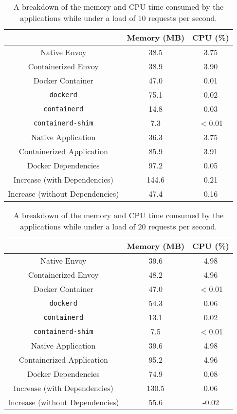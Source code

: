 \documentclass{article}
\begin{document}
\begin{table}[H]
\begin{tabular}{ |c|c|c| }
 \hline
   & Memory (MB) & CPU (\%) \\ 
 \hline
 Native Envoy & 38.5 & 3.75 \\
 \hline
 Containerized Envoy & 38.9 & 3.90 \\
 \hline
 Docker Container & 47.0 & 0.01 \\
 \hline
 \texttt{dockerd} & 75.1 & 0.02 \\
 \hline
 \texttt{containerd} & 14.8 & 0.03 \\
 \hline
 \texttt{containerd-shim} & 7.3 & $<$0.01 \\
 \hline\hline
 Native Application & 36.3 & 3.75 \\
 \hline
 Containerized Application & 85.9 & 3.91 \\
 \hline
 Docker Dependencies & 97.2 & 0.05 \\
 \hline\hline
 Increase (with Dependencies) & 144.6 & 0.21 \\
 \hline
 Increase (without Dependencies) & 47.4 & 0.16 \\
 \hline
\end{tabular}
\caption{A breakdown of the memory and CPU time consumed by the applications while under a load of 10 requests per second.}
\label{consumption-breakdown-under-load-10}
\end{table}

\begin{table}[H]
\begin{tabular}{ |c|c|c| }
 \hline
   & Memory (MB) & CPU (\%) \\ 
 \hline
 Native Envoy & 39.6 & 4.98 \\
 \hline
 Containerized Envoy & 48.2 & 4.96 \\
 \hline
 Docker Container & 47.0 & $<$0.01 \\
 \hline
 \texttt{dockerd} & 54.3 & 0.06 \\
 \hline
 \texttt{containerd} & 13.1 & 0.02 \\
 \hline
 \texttt{containerd-shim} & 7.5 & $<$0.01 \\
 \hline\hline
 Native Application & 39.6 & 4.98 \\
 \hline
 Containerized Application & 95.2 & 4.96 \\
 \hline
 Docker Dependencies & 74.9 & 0.08 \\
 \hline\hline
 Increase (with Dependencies) & 130.5 & 0.06 \\
 \hline
 Increase (without Dependencies) & 55.6 & -0.02 \\
 \hline
\end{tabular}
\caption{A breakdown of the memory and CPU time consumed by the applications while under a load of 20 requests per second.}
\label{consumption-breakdown-under-load-20}
\end{table}
\end{document}

